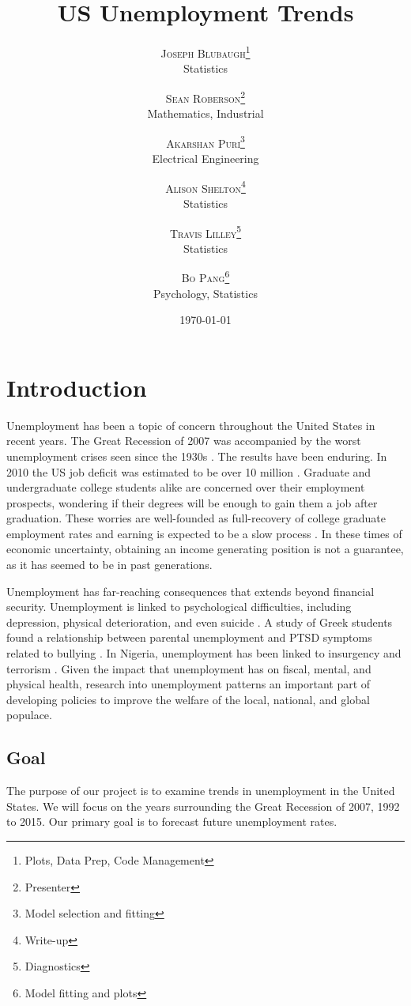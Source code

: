 \documentclass[twoside,twocolumn]{article}
\title{US Unemployment Trends} %
\author{%
\textsc{Joseph Blubaugh}\thanks{Plots, Data Prep, Code Management} \\[1ex] %
\normalsize Statistics\\ %
\and %
\textsc{Sean Roberson}\thanks{Presenter} \\[1ex] %
\normalsize Mathematics, Industrial\\ %
\and
\textsc{Akarshan Puri}\thanks{Model selection and fitting} \\[1ex]
\normalsize Electrical Engineering\\
\and
\textsc{Alison Shelton}\thanks{Write-up} \\[1ex]
\normalsize Statistics\\
\and
\textsc{Travis Lilley}\thanks{Diagnostics} \\[1ex]
\normalsize Statistics\\
\and
\textsc{Bo Pang}\thanks{Model fitting and plots} \\[1 ex]
\normalsize Psychology, Statistics
\vspace*{.5 cm}
}
\date{\today \vspace*{.25 cm}} %
\begin{document}
\maketitle



\section{Introduction}
		Unemployment has been a topic of concern throughout the United States in recent years.  The Great Recession of 2007 was accompanied by the worst unemployment crises seen since the 1930s \citep{wanberg2012individual}.   The results have been enduring. In 2010 the US job deficit was estimated to be over 10 million \citep{katz2010}. Graduate and undergraduate college students alike are concerned over their employment prospects, wondering if their degrees will be enough to gain them a job after graduation.  These worries are well-founded as full-recovery of college graduate employment rates and earning is expected to be a slow process \citep{carnevale2015hard}.  In these times of economic uncertainty, obtaining an income generating position is not a guarantee, as it has seemed to be in past generations.

Unemployment has far-reaching consequences that extends beyond financial security. Unemployment is linked to psychological difficulties, including depression, physical deterioration, and even suicide  \citep{wanberg2012individual, insecure, suicide}. A study of Greek students found a relationship between parental unemployment and PTSD symptoms related to bullying \citep{kanellopoulos2014epa}. In Nigeria, unemployment has been linked to insurgency and terrorism \citep{terrorism}. Given the impact that unemployment has on fiscal, mental, and physical health, research into unemployment patterns an important part of developing policies to improve the welfare of the local, national, and global populace.

\subsection{Goal}
		The purpose of our project is to examine trends in unemployment in the United States. We will focus on the years surrounding the Great Recession of 2007, 1992 to 2015.  Our primary goal is to forecast future unemployment rates.
\end{document}
